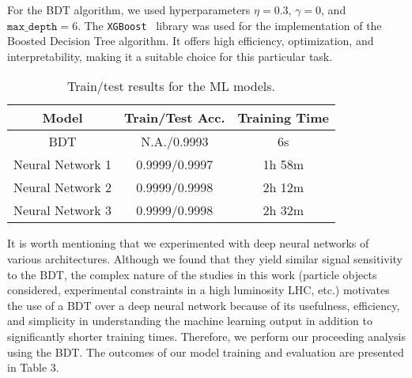 For the BDT algorithm, we used hyperparameters $\eta=0.3$, $\gamma = 0$, and $\texttt{max\_depth} = 6$. The \texttt{XGBoost}~\parencite{chen_xgboost_2016} library was used for the implementation of the Boosted Decision Tree algorithm. It offers high efficiency, optimization, and interpretability, making it a suitable choice for this particular task. 



\begin{table}
    \centering
    \begin{tabular}{c  c  c}
    \hline
    { Model} & { Train/Test Acc. } & { Training Time} \\
    \hline
    \small
    BDT & N.A./0.9993  & 6s\\
    Neural Network 1 & 0.9999/0.9997 & 1h 58m \\
    Neural Network 2 & 0.9999/0.9998 & 2h 12m \\
    Neural Network 3 & 0.9999/0.9998 & 2h 32m\\
    \hline
    \end{tabular}
    \caption{Train/test results for the ML models.}\label{tab:ml_results}
    \centering
\end{table}

It is worth mentioning that we experimented with deep neural networks of various architectures. Although we found that they yield similar signal sensitivity to the BDT, the complex nature of the studies in this
work (particle objects considered, experimental constraints in a high luminosity LHC, etc.) motivates the use of a BDT over a deep neural network because of its usefulness, efficiency, and simplicity in understanding the machine learning output in addition to significantly shorter training times. Therefore, we perform our proceeding analysis using the BDT. The outcomes of our model training and evaluation are presented in Table 3. 
